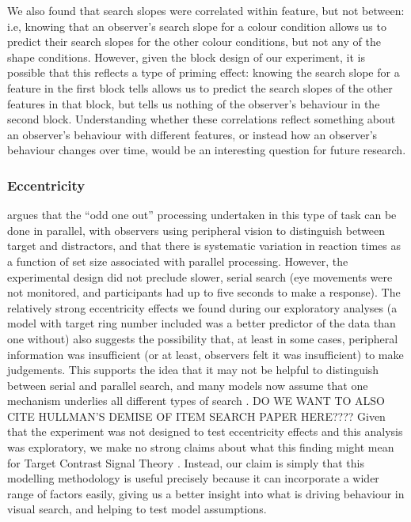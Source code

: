 \documentclass[preprint,12pt,authoryear]{elsarticle}
\begin{document}
We also found that search slopes were correlated within feature, but not between:  i.e, knowing that an observer's search slope for a colour condition allows us to predict their search slopes for the other colour conditions, but not any of the shape conditions. However, given the block design of our experiment, it is possible that this reflects a type of priming effect: knowing the search slope for a feature in the first block tells allows us to predict the search slopes of the other features in that block, but tells us nothing of the observer's behaviour in the second block. Understanding whether these correlations reflect something about an observer's behaviour with different features, or instead how an observer's behaviour changes over time, would be an interesting question for future research.

\subsubsection{Eccentricity}

\citep{buetti2019predicting} argues that the ``odd one out'' processing undertaken in this type of task can be done in parallel, with observers using peripheral vision to distinguish between target and distractors, and that there is systematic variation in reaction times as a function of set size associated with parallel processing. However, the experimental design did not preclude slower, serial search (eye movements were not monitored, and participants had up to five seconds to make a response). The relatively strong eccentricity effects we found during our exploratory analyses (a model with target ring number included was a better predictor of the data than one without) also suggests the possibility that, at least in some cases, peripheral information was insufficient (or at least, observers felt it was insufficient) to make judgements. This supports the idea that it may not be helpful to distinguish between serial and parallel search, and many models now assume that one mechanism underlies all different types of search \citep{wolfe1998can}. DO WE WANT TO ALSO CITE HULLMAN'S DEMISE OF ITEM SEARCH PAPER HERE???? Given that the experiment was not designed to test eccentricity effects and this analysis was exploratory, we make no strong claims about what this finding might mean for Target Contrast Signal Theory \cite{lleras2020target}. Instead, our claim is simply that this modelling methodology is useful precisely because it can incorporate a wider range of factors easily, giving us a better insight into what is driving behaviour in visual search, and helping to test model assumptions.
\end{document}
